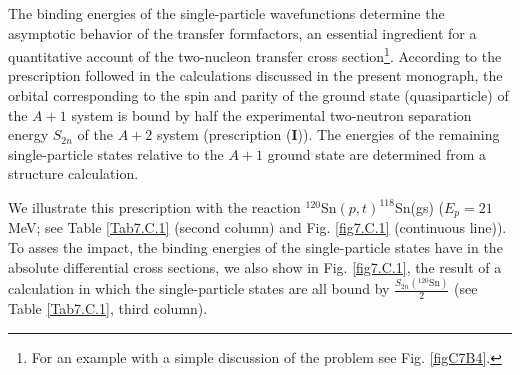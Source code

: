 \begin{subappendices}
The binding energies of the single-particle wavefunctions  determine the asymptotic behavior of the transfer formfactors, an essential ingredient for a quantitative account of the two-nucleon transfer cross section\footnote{For an example with a simple discussion of the problem see Fig. \ref{figC7B4}.}. According to the prescription followed in the calculations discussed in the present monograph, the  orbital corresponding to the spin and parity of the  ground state  (quasiparticle) of the  $A+1$ system is bound by half the experimental two-neutron separation energy $S_{2n}$ of the  $A+2$ system (prescription (\textbf{I})).  The energies of the remaining single-particle states relative to the $A+1$ ground state are determined from a structure calculation. 


We illustrate this prescription with the reaction $^{120}$Sn$(p,t)^{118}$Sn(gs) ($E_p=21$ MeV; see Table \ref{Tab7.C.1} (second column) and Fig. \ref{fig7.C.1} (continuous line)). To asses the impact, the binding energies of the single-particle states have in the absolute differential cross sections, we also show  in Fig. \ref{fig7.C.1}, the result of a calculation in which the single-particle states are all bound by $\frac{S_{2n}(^{120}\text{Sn})}{2}$ (see Table \ref{Tab7.C.1}, third column). 


\end{subappendices}

